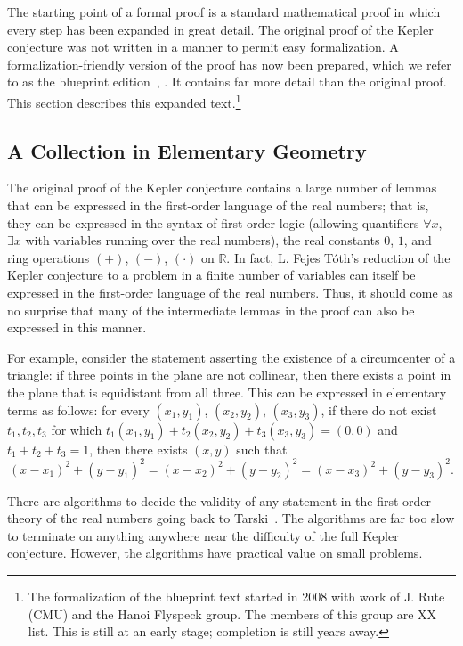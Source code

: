 \documentclass[11pt]{amsart}
\newcommand{\ring}[1]{\mathbb{#1}}
\begin{document}
The starting point of a formal proof is a standard mathematical proof in which every step
has been expanded in great detail.  The original proof of the Kepler conjecture was not written
in a manner to permit easy formalization.  A formalization-friendly version of the proof has
now been prepared, which we refer to as the blueprint edition~\cite{hales:2008:blueprint}, \cite{hales:2008:collection}.  It contains far more detail than the original proof.  This section 
describes this expanded text.\footnote{The formalization of the blueprint text started in
2008 with work of J. Rute (CMU) and the Hanoi Flyspeck group. The members of this group are
XX list.  This is still at an early stage; completion is still years away.}

\subsection*{A Collection in Elementary Geometry}

The original proof of the Kepler conjecture contains a large number of lemmas that can be
expressed in the first-order language of the real numbers; that is, they can be expressed in
the syntax of first-order logic (allowing quantifiers $\forall x$, $\exists x$ with variables
running over the real numbers), the real constants $0$, $1$, and ring operations $(+)$, $(-)$,
$(\cdot)$ on $\ring{R}$.  In fact, L. Fejes T\'oth's reduction of the Kepler conjecture to
a problem in a finite number of variables can itself be expressed in the
first-order language of the real numbers.  Thus, it should come as no surprise that many
of the intermediate lemmas in the proof can also be expressed in this manner.

For example, consider the statement asserting the existence of a circumcenter of a triangle: 
if three points in the plane are not collinear, then there exists a
point in the plane that is equidistant from all three.  This can be expressed in elementary terms
as follows:  for every $(x_1,y_1)$, $(x_2,y_2)$, $(x_3,y_3)$, if there do not exist $t_1,t_2,t_3$
for which $t_1 (x_1,y_1) + t_2 (x_2,y_2)+ t_3 (x_3,y_3) = (0,0)$ and $t_1+t_2+t_3=1$, then there exists
$(x,y)$ such that 
$$
  (x-x_1)^2 + (y-y_1)^2 = (x-x_2)^2 + (y-y_2)^2 = (x-x_3)^2 + (y-y_3)^2. 
$$

There are algorithms to decide the validity of any statement in the first-order theory of the
real numbers going back to Tarski~\cite{caviness-johnson}.  The algorithms are far too slow to terminate
on anything anywhere near the difficulty of the full Kepler conjecture.  However, the algorithms
have practical value on small problems.
\end{document}
